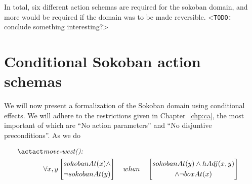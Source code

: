 \documentclass[../Master.tex]{subfiles}
\begin{document}
In total, six different action schemas are required for the sokoban domain, and more would be required if the domain was to be made reversible. <\texttt{TODO:} conclude something interesting?>

\section{Conditional Sokoban action schemas}

We will now present a formalization of the Sokoban domain using conditional effects. We will adhere to the restrictions given in Chapter~\ref{chp:ca}, the most important of which are ``No action parameters'' and ``No disjuntive preconditions''. As we do 

\begin{align*}
\actact & \textit{move-west(): } &  \\
& \forall x, y
    \left[
        \begin{gathered}
            sokobanAt(x) \land 
            \\ \neg sokobanAt(y) 
        \end{gathered}
    \right]
    \quad when \quad
    \left[ 
        \begin{gathered}
            sokobanAt(y) \land hAdj(x,y) \\ 
            \land \neg boxAt(x)
        \end{gathered}
    \right]
\end{align*}
\end{document}
